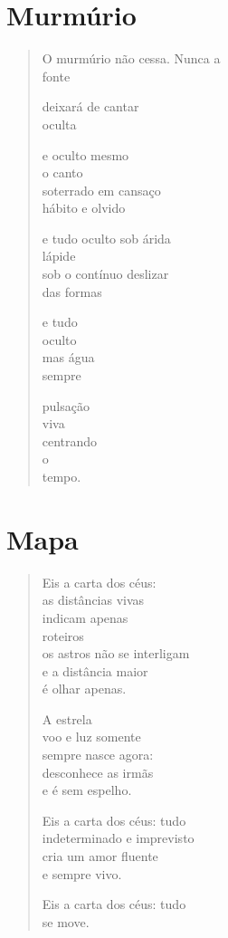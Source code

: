\chapter{Murmúrio}

\begin{verse}
O murmúrio não cessa. Nunca a\\
\quad\qquad\qquad\qquad\qquad\quad fonte

deixará de cantar\\
oculta

e oculto mesmo\\
o canto\\
soterrado em cansaço\\
hábito e olvido

e tudo oculto sob árida\\
lápide\\
sob o contínuo deslizar\\
das formas

e tudo\\
oculto\\
mas água\\
sempre

pulsação\\
viva\\
centrando\\
o\\
tempo.
\end{verse}

\chapter{Mapa}

\begin{verse}
Eis a carta dos céus:\\
as distâncias vivas\\
indicam apenas\\
roteiros\\
os astros não se interligam\\
e a distância maior\\
é olhar apenas.

A estrela\\
voo e luz somente\\
sempre nasce agora:\\
desconhece as irmãs\\
e é sem espelho.

Eis a carta dos céus: tudo\\
indeterminado e imprevisto\\
cria um amor fluente\\
e sempre vivo.

Eis a carta dos céus: tudo\\
\qquad\qquad\qquad\qquad se move.
\end{verse}

